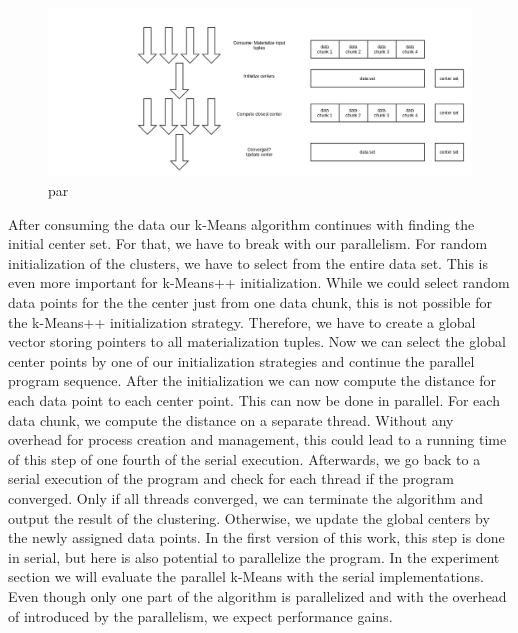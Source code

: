 \begin{figure}[htsb]
  \centering
  \includegraphics[scale=0.3]{figures/parallel}
  \caption[par]{par}
  \label{fig:parallel}
\end{figure}

After consuming the data our k-Means algorithm continues with finding the initial center set. For that, we have to break with our parallelism. For random initialization of the clusters, we have to select from the entire data set. This is even more important  for k-Means++ initialization. While we could select random data points for the the center just from one data chunk, this is not possible for the k-Means++ initialization strategy. Therefore, we have to create a global vector storing pointers to all materialization tuples. Now we can select the global center points by one of our initialization strategies and continue the parallel program sequence.
After the initialization we can now compute the distance for each data point to each center point. This can now be done in parallel. For each data chunk, we compute the distance on a separate thread. Without any overhead for process creation and management, this could lead to a running time of  this step of one fourth of the serial execution.
Afterwards, we go back to a serial execution of the program and check for each thread if the program converged. Only if all threads converged, we can terminate the algorithm and output the result of the clustering. Otherwise, we update the global centers by the newly assigned data points. In the first version of this work, this step is done in serial, but here is also potential to parallelize the program.
In the experiment section we will evaluate the parallel k-Means with the serial implementations. Even though only one part of the algorithm is parallelized and with the overhead of introduced by the parallelism, we expect performance gains.





